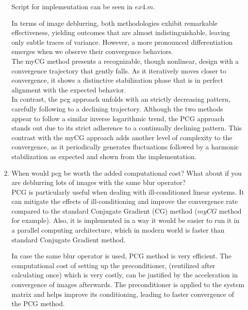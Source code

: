 \documentclass[unicode,11pt,a4paper,oneside,numbers=endperiod,openany]{scrartcl}
\begin{document}
\begin{enumerate}
Script for implementation can be seen in ${ex4.m}$. \\

\newpage

In terms of image deblurring, both methodologies exhibit remarkable effectiveness, yielding outcomes that are almost indistinguishable, leaving only subtle traces of variance. However, a more pronounced differentiation emerges when we observe their convergence behaviors. \\

The myCG method presents a recognizable, though nonlinear, design with a convergence trajectory that gently falls. As it iteratively moves closer to convergence, it shows a distinctive stabilization phase that is in perfect alignment with the expected behavior. \\

In contrast, the pcg approach unfolds with an strictly decreasing pattern, carefully following to a declining trajectory. Although the two methods appear to follow a similar inverse logarithmic trend, the PCG approach stands out due to its strict adherence to a continually declining pattern. This contrast with the myCG approach adds another level of complexity to the convergence, as it periodically generates fluctuations followed by a harmonic stabilization as expected and shown from the implementation. \\

\item When would pcg be worth the added computational cost? What about if you are deblurring lots of images with
the same blur operator? \\

PCG is particularly useful when dealing with ill-conditioned linear systems. It can mitigate the effects of ill-conditioning and improve the convergence rate compared to the standard Conjugate Gradient (CG) method (${myCG}$ method for example). Also, it is implemented in a way it would be easier to run it in a parallel computing architecture, which in modern world is faster than standard Conjugate Gradient method.

In case the same blur operator is used, PCG method is very efficient. The computational cost of setting up the preconditioner, (reutilized after calculating once) which is very costly, can be justified by the acceleration in convergence of images afterwards. The preconditioner is applied to the system matrix and helps improve its conditioning, leading to faster convergence of the PCG method.


\end{enumerate}
\end{document}
